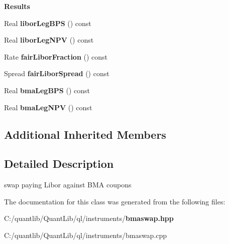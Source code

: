 \begin{Indent}{\bf Results}\par
\begin{DoxyCompactItemize}
\item 
Real {\bfseries libor\+Leg\+B\+PS} () const \label{class_quant_lib_1_1_b_m_a_swap_ab3d1bd2defd628691f0280a6e41e52d2}

\item 
Real {\bfseries libor\+Leg\+N\+PV} () const \label{class_quant_lib_1_1_b_m_a_swap_adc9e746b6b8d610345c0d02339589b24}

\item 
Rate {\bfseries fair\+Libor\+Fraction} () const \label{class_quant_lib_1_1_b_m_a_swap_a2f3a0514a4186bf4318fdf51b6c1c077}

\item 
Spread {\bfseries fair\+Libor\+Spread} () const \label{class_quant_lib_1_1_b_m_a_swap_ad6cd20a15b0162020a75f7e94ac66d0c}

\item 
Real {\bfseries bma\+Leg\+B\+PS} () const \label{class_quant_lib_1_1_b_m_a_swap_a2292ccc67381cd159d28d5801c6a2b4e}

\item 
Real {\bfseries bma\+Leg\+N\+PV} () const \label{class_quant_lib_1_1_b_m_a_swap_a918f2937e59e5c10ff8e85e77d396b4c}

\end{DoxyCompactItemize}
\end{Indent}
\subsection*{Additional Inherited Members}


\subsection{Detailed Description}
swap paying Libor against B\+MA coupons 

The documentation for this class was generated from the following files\+:\begin{DoxyCompactItemize}
\item 
C\+:/quantlib/\+Quant\+Lib/ql/instruments/{\bf bmaswap.\+hpp}\item 
C\+:/quantlib/\+Quant\+Lib/ql/instruments/bmaswap.\+cpp\end{DoxyCompactItemize}
